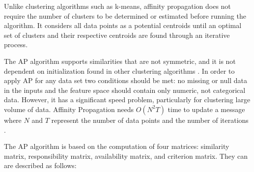 Unlike clustering algorithms such as k-means, affinity propagation does not require the number of clusters to be determined or estimated before running the algorithm. It considers all data points as a potential centroids until an optimal set of clusters and their respective centroids are found through an iterative process. %




The AP algorithm supports similarities that are not symmetric, and it is not dependent on initialization found in other clustering algorithms \cite{refianti2017time}. In order to apply AP for any data set two conditions should be met: no missing or null data in the inputs and the feature space should contain only numeric, not categorical data. However, it has a significant speed problem, particularly for clustering large volume of data. Affinity Propagation needs $O(N^2T)$ time to update a message where $N$ and $T$ represent the number of data points and the number of iterations \cite{frey2007clustering}. 


The AP algorithm is based on the computation of four matrices: similarity matrix, responsibility matrix, availability matrix, and criterion matrix. They can are described as follows:

